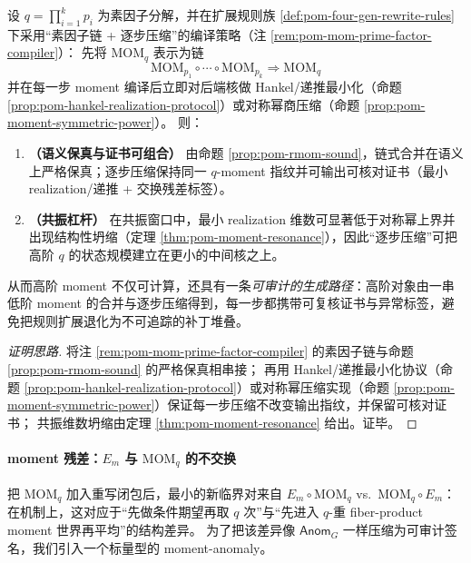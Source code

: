 \begin{theorem}\label{thm:pom-prime-factor-moment-compiler-resonance}
设 \(q=\prod_{i=1}^{k}p_i\) 为素因子分解，并在扩展规则族 \ref{def:pom-four-gen-rewrite-rules} 下采用“素因子链 + 逐步压缩”的编译策略（注 \ref{rem:pom-mom-prime-factor-compiler}）：
先将 \(\mathrm{MOM}_q\) 表示为链
\[
\mathrm{MOM}_{p_1}\circ\cdots\circ \mathrm{MOM}_{p_k}\Rightarrow \mathrm{MOM}_q
\]
并在每一步 moment 编译后立即对后端核做 Hankel/递推最小化（命题 \ref{prop:pom-hankel-realization-protocol}）或对称幂商压缩（命题 \ref{prop:pom-moment-symmetric-power}）。
则：
\begin{enumerate}
  \item \textbf{（语义保真与证书可组合）} 由命题 \ref{prop:pom-rmom-sound}，链式合并在语义上严格保真；逐步压缩保持同一 \(q\)-moment 指纹并可输出可核对证书（最小 realization/递推 + 交换残差标签）。
  \item \textbf{（共振杠杆）} 在共振窗口中，最小 realization 维数可显著低于对称幂上界并出现结构性坍缩（定理 \ref{thm:pom-moment-resonance}），因此“逐步压缩”可把高阶 \(q\) 的状态规模建立在更小的中间核之上。
\end{enumerate}
从而高阶 moment 不仅可计算，还具有一条\emph{可审计的生成路径}：高阶对象由一串低阶 moment 的合并与逐步压缩得到，每一步都携带可复核证书与异常标签，避免把规则扩展退化为不可追踪的补丁堆叠。
\end{theorem}

\begin{proof}[证明思路]
将注 \ref{rem:pom-mom-prime-factor-compiler} 的素因子链与命题 \ref{prop:pom-rmom-sound} 的严格保真相串接；
再用 Hankel/递推最小化协议（命题 \ref{prop:pom-hankel-realization-protocol}）或对称幂压缩实现（命题 \ref{prop:pom-moment-symmetric-power}）保证每一步压缩不改变输出指纹，并保留可核对证书；
共振维数坍缩由定理 \ref{thm:pom-moment-resonance} 给出。证毕。
\end{proof}

\paragraph{moment 残差：\texorpdfstring{$E_m$}{Em} 与 \texorpdfstring{$\mathrm{MOM}_q$}{MOMq} 的不交换}
把 \(\mathrm{MOM}_q\) 加入重写闭包后，最小的新临界对来自
\(
E_m\circ \mathrm{MOM}_q
\)
vs.\
\(
\mathrm{MOM}_q\circ E_m
\)：
在机制上，这对应于“先做条件期望再取 \(q\) 次”与“先进入 \(q\)-重 fiber-product moment 世界再平均”的结构差异。
为了把该差异像 \(\mathsf{Anom}_G\) 一样压缩为可审计签名，我们引入一个标量型的 moment-anomaly。

